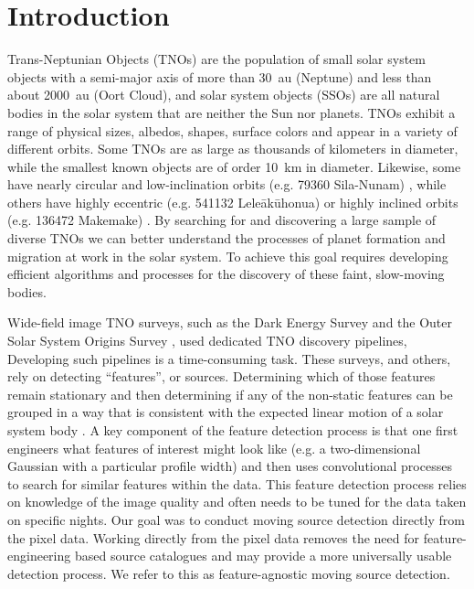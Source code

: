 \documentclass{aastex631}
\begin{document}
\section{Introduction} \label{sec:intro}
Trans-Neptunian Objects (TNOs) are the population of small solar system objects with a semi-major axis of more than 30~au (Neptune) and less than about 2000~au (Oort Cloud), and solar system objects (SSOs) are all natural bodies in the solar system that are neither the Sun nor planets.
TNOs exhibit a range of physical sizes, albedos, shapes, surface colors and appear in a variety of different orbits.
Some TNOs are as large as thousands of kilometers in diameter, while the smallest known objects are of order 10~km in diameter.
Likewise, some have nearly circular and low-inclination orbits (e.g. 79360 Sila-Nunam) \citep{1997MPEC....N...08L}, while others have highly eccentric (e.g. 541132 Leleākūhonua) \citep{2019AJ....157..139S} or highly inclined orbits (e.g. 136472 Makemake) \citep{2005IAUC.8577....1B}.
By searching for and discovering a large sample of diverse TNOs we can better understand the processes of planet formation and migration at work in the solar system.  
To achieve this goal requires developing efficient algorithms and processes for the discovery of these faint, slow-moving bodies.

Wide-field image TNO surveys, such as the Dark Energy Survey \citep{2020ApJS..247...32B} and the Outer Solar System Origins Survey \citep{2016AJ....152...70B}, used dedicated TNO discovery pipelines, Developing such pipelines is a time-consuming task.
These surveys, and others, rely on detecting ``features'', or sources. 
Determining which of those features remain stationary and then determining if any of the non-static features can be grouped in a way that is consistent with the expected linear motion of a solar system body \citep[see][for a complete description of such a detection system]{2004MNRAS.347..471P}.
A key component of the feature detection process is that one first engineers what features of interest might look like (e.g. a two-dimensional Gaussian with a particular profile width) and then uses convolutional processes to search for similar features within the data.
This feature detection process relies on knowledge of the image quality and often needs to be tuned for the data taken on specific nights.
Our goal was to conduct moving source detection directly from the pixel data.
Working directly from the pixel data removes the need for feature-engineering based source catalogues \citep[section 3]{2016AJ....151..158F} and may provide a more universally usable detection process.
We refer to this as feature-agnostic moving source detection.
\end{document}

